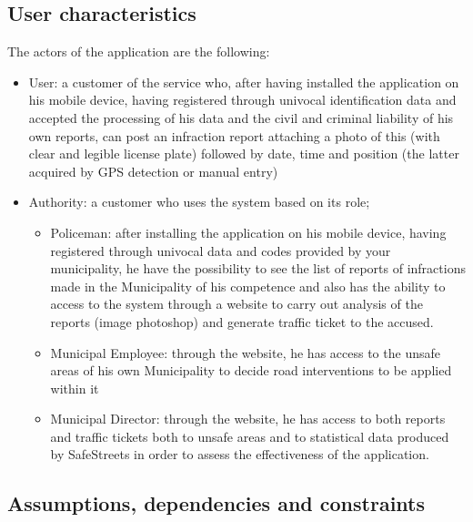\documentclass{article}
\begin{document}
\subsection{User characteristics}
The actors of the application are the following:
\begin{itemize}
    \item User: a customer of the service who, after having installed the
    application on his mobile device, having registered through univocal
    identification data and accepted the processing of his data and the civil
    and criminal liability of his own reports, can post an infraction report
    attaching a photo of this (with clear and legible license plate) followed by
    date, time and position (the latter acquired by GPS detection or manual
    entry)
    \item Authority: a customer who uses the system based on its role;
    \begin{itemize}
        \item Policeman: after installing the application on his mobile device,
        having registered through univocal data and codes provided by your
        municipality, he have the possibility to see the list of reports of
        infractions made in the Municipality of his competence and also has the
        ability to access to the system through a website to carry out analysis
        of the reports (image photoshop) and generate traffic ticket to the
        accused.
        \item Municipal Employee: through the website, he has access to the
        unsafe areas of his own Municipality to decide road interventions to be
        applied within it
        \item Municipal Director: through the website, he has access to both
        reports and traffic tickets both to unsafe areas and to statistical data
        produced by SafeStreets in order to assess the effectiveness of the
        application.
    \end{itemize}
\end{itemize}
\subsection{Assumptions, dependencies and constraints}
\end{document}
